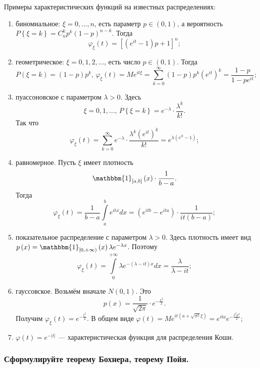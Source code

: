 Примеры характеристических функций на известных распределениях:
\begin{enumerate}
\item биномиальное: $ \xi = 0, \dotsc, n$, есть параметр $p \in \left( 0, 1 \right) $,
а вероятность $P \left\{ \xi = k \right\} = C_n^k p^k \left( 1 - p \right)^{n-k}$.
Тогда
$$ \varphi_{ \xi } \left( t \right) =
  \left[ \left( e^{it} - 1 \right) p + 1 \right]^n;$$
\item геометрическое: $ \xi = 0, 1, 2, \dotsc $, есть число $p \in \left( 0, 1 \right) $.
Тогда
$$P \left( \xi = k \right) = \left( 1-p \right) p^k, \,
  \varphi_{ \xi } \left( t \right) =
  Me^{it \xi } =
  \sum \limits_{k=0}^{ \infty } \left( 1-p \right) p^k \left( e^{it} \right)^k =
  \frac{1-p}{1-pe^{it}};$$
\item пуассоновское с параметром $ \lambda > 0$.
Здесь
$$ \xi = 0, 1, \dotsc, \,
P \left\{ \xi = k \right\} = e^{- \lambda } \cdot \frac{ \lambda^k}{k!}.$$
Так что
$$ \varphi_{ \xi } \left( t \right) =
\sum \limits_{k=0}^{ \infty } e^{- \lambda } \cdot \frac{ \lambda^k \left( e^{it} \right)^k}{k!} =
e^{ \lambda \left( e^{it} - 1 \right) };$$
\item равномерное.
Пусть $ \xi $ имеет плотность
$$ \mathbbm{1}_{ \left[ a, b \right] } \left( x \right) \cdot \frac{1}{b-a}.$$
Тогда
$$ \varphi_{ \xi } \left( t \right) =
  \frac{1}{b-a} \int \limits_a^b e^{itx} dx =
  \left( e^{itb} - e^{ita} \right) \cdot \frac{1}{it \left( b-a \right)};$$
\item показательное распределение с параметром $ \lambda > 0$.
Здесь плотность имеет вид
$p \left( x \right) =
  \mathbbm{1}_{ \left[ 0, + \infty \right) } \left( x \right) \lambda e^{- \lambda x}$.
Поэтому
$$ \varphi_{ \xi } \left( t \right) =
  \int \limits_0^{+ \infty } \lambda e^{- \left( \lambda - it \right) x} dx =
  \frac{ \lambda }{ \lambda - it};$$
\item гауссовское.
Возьмём вначале $N \left( 0, 1 \right) $.
Это
$$p \left( x \right) =
  \frac{1}{ \sqrt{2 \pi }} \cdot e^{- \frac{x^2}{2}}.$$
Получим $ \varphi_{ \xi } \left( t \right) = e^{- \frac{t^2}{2}}$.
В общем виде
$ \varphi \left( t \right) =
  Me^{it \left( a + \sqrt{ \sigma^2} \xi \right) } =
  e^{ita} e^{- \frac{t^2 \sigma^2}{2}}$;
\item
  $ \varphi \left( t \right) = e^{- \left| t \right| }$ ---
  характеристическая функция для распределения Коши.
\end{enumerate}

\subsubsection*{Сформулируйте теорему Бохнера, теорему Пойя.}

